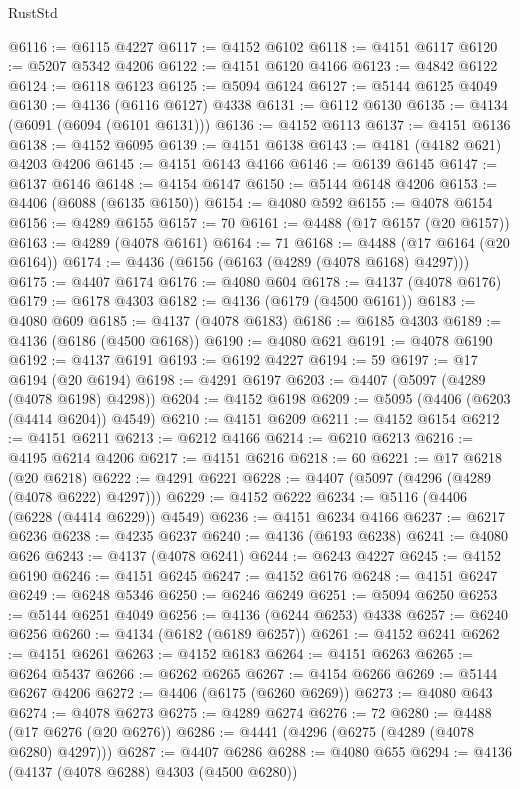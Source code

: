 \begin{lexlean}{RustStd}
\begin{coremodule}
{\begin{coremodule}
{{{{{{{{{{{{{{{{{{{{{{{{{{{{{{{{{{{{{{{{{{{{{{{{{{@6116 := @6115 @4227
@6117 := @4152 @6102
@6118 := @4151 @6117
@6120 := @5207 @5342 @4206
@6122 := @4151 @6120 @4166
@6123 := @4842 @6122
@6124 := @6118 @6123
@6125 := @5094 @6124
@6127 := @5144 @6125 @4049
@6130 := @4136 (@6116 @6127) @4338
@6131 := @6112 @6130
@6135 := @4134 (@6091 (@6094 (@6101 @6131)))
@6136 := @4152 @6113
@6137 := @4151 @6136
@6138 := @4152 @6095
@6139 := @4151 @6138
@6143 := @4181 (@4182 @621) @4203 @4206
@6145 := @4151 @6143 @4166
@6146 := @6139 @6145
@6147 := @6137 @6146
@6148 := @4154 @6147
@6150 := @5144 @6148 @4206
@6153 := @4406 (@6088 (@6135 @6150))
@6154 := @4080 @592
@6155 := @4078 @6154
@6156 := @4289 @6155
@6157 := 70
@6161 := @4488 (@17 @6157 (@20 @6157))
@6163 := @4289 (@4078 @6161)
@6164 := 71
@6168 := @4488 (@17 @6164 (@20 @6164))
@6174 := @4436 (@6156 (@6163 (@4289 (@4078 @6168) @4297)))
@6175 := @4407 @6174
@6176 := @4080 @604
@6178 := @4137 (@4078 @6176)
@6179 := @6178 @4303
@6182 := @4136 (@6179 (@4500 @6161))
@6183 := @4080 @609
@6185 := @4137 (@4078 @6183)
@6186 := @6185 @4303
@6189 := @4136 (@6186 (@4500 @6168))
@6190 := @4080 @621
@6191 := @4078 @6190
@6192 := @4137 @6191
@6193 := @6192 @4227
@6194 := 59
@6197 := @17 @6194 (@20 @6194)
@6198 := @4291 @6197
@6203 := @4407 (@5097 (@4289 (@4078 @6198) @4298))
@6204 := @4152 @6198
@6209 := @5095 (@4406 (@6203 (@4414 @6204)) @4549)
@6210 := @4151 @6209
@6211 := @4152 @6154
@6212 := @4151 @6211
@6213 := @6212 @4166
@6214 := @6210 @6213
@6216 := @4195 @6214 @4206
@6217 := @4151 @6216
@6218 := 60
@6221 := @17 @6218 (@20 @6218)
@6222 := @4291 @6221
@6228 := @4407 (@5097 (@4296 (@4289 (@4078 @6222) @4297)))
@6229 := @4152 @6222
@6234 := @5116 (@4406 (@6228 (@4414 @6229)) @4549)
@6236 := @4151 @6234 @4166
@6237 := @6217 @6236
@6238 := @4235 @6237
@6240 := @4136 (@6193 @6238)
@6241 := @4080 @626
@6243 := @4137 (@4078 @6241)
@6244 := @6243 @4227
@6245 := @4152 @6190
@6246 := @4151 @6245
@6247 := @4152 @6176
@6248 := @4151 @6247
@6249 := @6248 @5346
@6250 := @6246 @6249
@6251 := @5094 @6250
@6253 := @5144 @6251 @4049
@6256 := @4136 (@6244 @6253) @4338
@6257 := @6240 @6256
@6260 := @4134 (@6182 (@6189 @6257))
@6261 := @4152 @6241
@6262 := @4151 @6261
@6263 := @4152 @6183
@6264 := @4151 @6263
@6265 := @6264 @5437
@6266 := @6262 @6265
@6267 := @4154 @6266
@6269 := @5144 @6267 @4206
@6272 := @4406 (@6175 (@6260 @6269))
@6273 := @4080 @643
@6274 := @4078 @6273
@6275 := @4289 @6274
@6276 := 72
@6280 := @4488 (@17 @6276 (@20 @6276))
@6286 := @4441 (@4296 (@6275 (@4289 (@4078 @6280) @4297)))
@6287 := @4407 @6286
@6288 := @4080 @655
@6294 := @4136 (@4137 (@4078 @6288) @4303 (@4500 @6280))
}}}}}}}}}}}}}}}}}}}}}}}}}}}}}}}}}}}}}}}}}}}}}}}}}}
\end{coremodule}}
\end{coremodule}
\end{lexlean}
